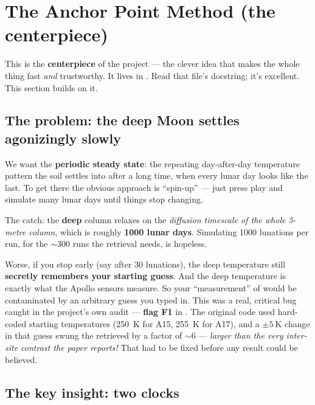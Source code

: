 \section{The Anchor Point Method (the centerpiece)}
\label{sec:anchor}

This is the \textbf{centerpiece} of the project --- the clever idea that makes
the whole thing fast \emph{and} trustworthy. It lives in
. Read that file's docstring; it's excellent. This
section builds on it.

\subsection{The problem: the deep Moon settles agonizingly slowly}

We want the \textbf{periodic steady state}: the repeating day-after-day
temperature pattern the soil settles into after a long time, when every lunar day
looks like the last. To get there the obvious approach is ``spin-up'' --- just
press play and simulate many lunar days until things stop changing.

The catch: the \textbf{deep} column relaxes on the \emph{diffusion timescale of
the whole 5-metre column}, which is roughly \textbf{1000 lunar days}. Simulating
1000 lunations per run, for the ${\sim}300$ runs the retrieval needs, is
hopeless.

Worse, if you stop early (say after 30 lunations), the deep temperature still
\textbf{secretly remembers your starting guess}. And the deep temperature is
exactly what the Apollo sensors measure. So your ``measurement'' of \Kd{} would
be contaminated by an arbitrary guess you typed in. This was a real, critical bug
caught in the project's own audit --- \textbf{flag F1} in
. The original code used hard-coded starting
temperatures (\SI{250}{\kelvin} for A15, \SI{255}{\kelvin} for A17), and a
$\pm\SI{5}{\kelvin}$ change in that guess swung the retrieved \Kdstar{} by a
factor of ${\sim}6$ --- \emph{larger than the very inter-site contrast the paper
reports!} That had to be fixed before any result could be believed.

\subsection{The key insight: two clocks}
\label{sec:twoclocks}

